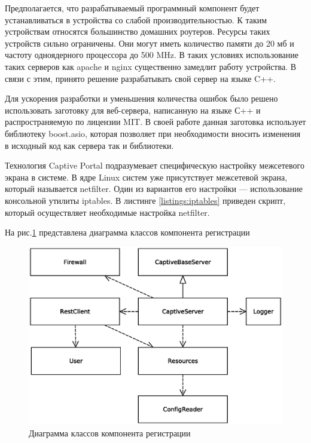 Предполагается, что разрабатываемый программный компонент будет устанавливаться в устройства со слабой производительностью. К таким устройствам относятся большинство домашних роутеров. Ресурсы таких устройств сильно ограничены. Они могут иметь количество памяти до 20 мб и частоту одноядерного процессора до 500 MHz. В таких условиях использование таких серверов как apache и nginx существенно замедлит работу устройства. В связи с этим, принято решение разрабатывать свой сервер на языке C++.

Для ускорения разработки и уменьшения количества ошибок было решено использовать заготовку для веб-сервера\cite{simpleServer}, написанную на языке С++ и распространяемую по лицензии MIT\cite{simpleServerMIT}. В своей работе данная заготовка использует библиотеку boost.asio\cite{boost}, которая позволяет при необходимости вносить изменения в исходный код как сервера так и библиотеки.

Технология Captive Portal подразумевает специфическую настройку межсетевого экрана в системе. В ядре Linux систем уже присутствует межсетевой экрана, который называется netfilter. Один из вариантов его настройки --- использование консольной утилиты iptables. В листинге \ref{listings:iptables} приведен скрипт, который осуществляет необходимые настройка netfilter.

На рис.\ref{fig:CPUML} представлена диаграмма классов компонента регистрации

\begin{figure}[h]
	\centering
	\includegraphics[width=\linewidth]{fig/CPUML}
	\caption{Диаграмма классов компонента регистрации}
	\label{fig:CPUML}
\end{figure}

